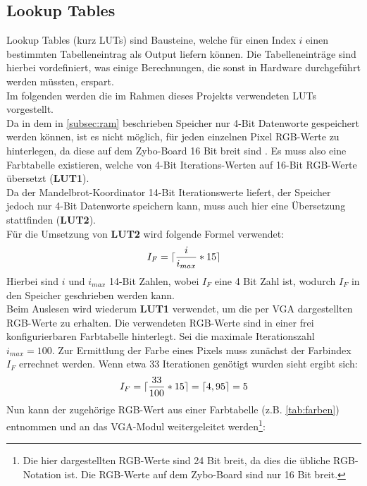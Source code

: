 \documentclass[a4paper,12pt,onesided]{report}
\begin{document}
\subsection{Lookup Tables}
\label{subsec:luts}
Lookup Tables (kurz LUTs) sind Bausteine, welche für einen Index $i$ einen bestimmten Tabelleneintrag als Output liefern können.
Die Tabelleneinträge sind hierbei vordefiniert, was einige Berechnungen, die sonst in Hardware durchgeführt werden müssten, erspart.\\
Im folgenden werden die im Rahmen dieses Projekts %
verwendeten LUTs vorgestellt.\\
Da in dem in \autoref{subsec:ram} beschrieben Speicher nur 4-Bit Datenworte gespeichert werden können, ist es nicht möglich, für jeden einzelnen Pixel RGB-Werte zu hinterlegen, da diese auf dem Zybo-Board 16 Bit breit sind \cite{zyboref}. Es muss also eine Farbtabelle existieren, welche von 4-Bit Iterations-Werten auf 16-Bit RGB-Werte übersetzt (\textbf{LUT1}).\\
Da der Mandelbrot-Koordinator 14-Bit Iterationswerte liefert, der Speicher jedoch nur 4-Bit %
Datenworte speichern kann, muss auch hier eine Übersetzung stattfinden (\textbf{LUT2}).\\
Für die Umsetzung von \textbf{LUT2} wird folgende Formel verwendet:
\[I_F = \lceil\frac{i}{i_{max}}*15\rceil\]
Hierbei sind $i$ und $i_{max}$ 14-Bit Zahlen, wobei $I_F$ eine 4 Bit Zahl ist, wodurch $I_F$ in den Speicher geschrieben werden kann.\\
Beim Auslesen wird wiederum \textbf{LUT1} verwendet, um die per VGA dargestellten RGB-Werte zu erhalten.
Die verwendeten RGB-Werte sind in einer frei konfigurierbaren %
Farbtabelle hinterlegt.
Sei die maximale Iterationszahl $i_{max} = 100$.
Zur Ermittlung der Farbe eines Pixels muss zunächst der Farbindex $I_F$ errechnet werden. Wenn etwa 33 Iterationen genötigt wurden sieht ergibt sich:
\[I_F = \lceil\frac{33}{100}*15\rceil = \lceil4,95\rceil = 5\]
Nun kann der zugehörige RGB-Wert aus einer Farbtabelle (z.B. \autoref{tab:farben}) entnommen und an das VGA-Modul weitergeleitet werden\footnote{Die hier dargestellten RGB-Werte sind 24 Bit breit, da dies die übliche RGB-Notation ist. Die RGB-Werte auf dem Zybo-Board sind nur 16 Bit breit.}:
\end{document}
